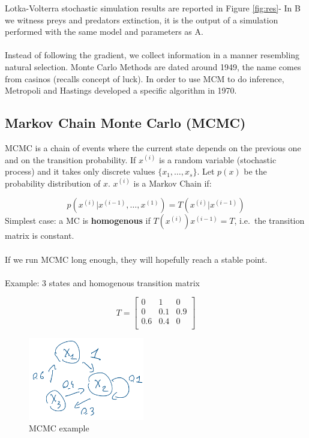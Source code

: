 Lotka-Volterra stochastic simulation results are reported in Figure \ref{fig:res}- In B we witness preys and
predators extinction, it is the output of a simulation performed with
the same model and parameters as A.
\\
\\
\noindent
Instead of following the gradient, we collect information in a manner
resembling natural selection. Monte Carlo Methods are dated around 1949,
the name comes from casinos (recalls concept of luck). In order to use
MCM to do inference, Metropoli and Hastings developed a specific
algorithm in 1970.


\subsection{Markov Chain Monte Carlo (MCMC)}

MCMC is a chain of events where the current state depends on the
previous one and on the transition probability.
\noindent
If $x^{(i)}$ is a random variable (stochastic process) and it takes only
discrete values $\{x_1,\dots,x_s\}$. Let $p(x)$ be the probability
distribution of $x$. $x^{(i)}$ is a Markov Chain if:

$$
p(x^{(i)}|x^{(i-1)},\dots,x^{(1)})=T(x^{(i)}|x^{(i-1)})
$$
\noindent
Simplest case: a MC is \textbf{homogenous} if $T(x^{(i)})x^{(i-1)}=T$,
i.e.~the transition matrix is constant.
\\
\\
\noindent
If we run MCMC long enough, they will hopefully reach a stable point.
\\
\\
\noindent
Example: 3 states and homogenous transition matrix

$$
T = \begin{bmatrix}
0 & 1 & 0\\
0 & 0.1 & 0.9\\ 0.6 & 0.4 & 0\\
\end{bmatrix}
$$

\begin{figure}
\centering
\includegraphics[width=0.45\textwidth]{mcmc.png}
\caption{MCMC example}
\label{fig:MCMCexample}
\end{figure}

